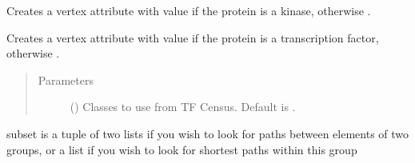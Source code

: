 \documentclass[letterpaper,10pt,english]{sphinxmanual}
\begin{document}
\begin{fulllineitems}
\begin{fulllineitems}
\end{fulllineitems}


\begin{fulllineitems}
\label{\detokenize{main:pypath.main.PyPath.set_signaling_proteins}}
Creates a vertex attribute  with value  if
the protein is a kinase, otherwise .

\end{fulllineitems}


\begin{fulllineitems}
\label{\detokenize{main:pypath.main.PyPath.set_tfs}}
\end{fulllineitems}


\begin{fulllineitems}
\label{\detokenize{main:pypath.main.PyPath.set_transcription_factors}}
Creates a vertex attribute  with value  if
the protein is a transcription factor, otherwise .
\begin{quote}\begin{description}
\item[{Parameters}] \leavevmode
{} () \textendash{} Classes to use from TF Census. Default is \sphinxtitleref{{[}‘a’, ‘b’, ‘other’{]}}.

\end{description}\end{quote}

\end{fulllineitems}


\begin{fulllineitems}
\label{\detokenize{main:pypath.main.PyPath.shortest_path_dist}}
subset is a tuple of two lists if you wish to look for
paths between elements of two groups, or a list if you
wish to look for shortest paths within this group


\end{fulllineitems}
\end{fulllineitems}
\end{document}
